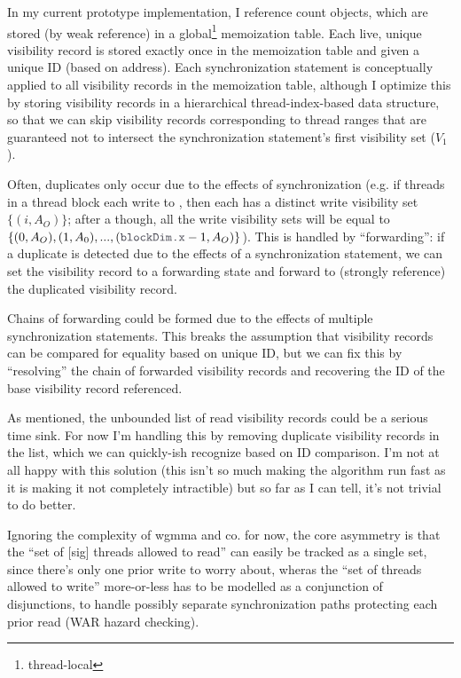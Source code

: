\filbreak
In my current prototype implementation, I reference count  objects, which are stored (by weak reference) in a global\footnote{thread-local} memoization table.
Each live, unique visibility record is stored exactly once in the memoization table and given a unique ID (based on address).
Each synchronization statement is conceptually applied to all visibility records in the memoization table, although I optimize this by storing visibility records in a hierarchical thread-index-based data structure, so that we can skip visibility records corresponding to thread ranges that are guaranteed not to intersect the synchronization statement's first visibility set ($V_1$).

\filbreak
Often, duplicates only occur due to the effects of synchronization (e.g. if threads in a thread block each write to , then each  has a distinct write visibility set ${\{(i, A_O)\}}$; after a  though, all the write visibility sets will be equal to ${\{(0, A_O), (1, A_0), ... ,(\lighttt{blockDim.x}-1, A_O)\}}$).
This is handled by ``forwarding'': if a duplicate is detected due to the effects of a synchronization statement, we can set the visibility record to a forwarding state and forward to (strongly reference) the duplicated visibility record.

\filbreak
Chains of forwarding could be formed due to the effects of multiple synchronization statements.
This breaks the assumption that visibility records can be compared for equality based on unique ID, but we can fix this by ``resolving'' the chain of forwarded visibility records and recovering the ID of the base visibility record referenced.

\filbreak
{} As mentioned, the unbounded list of read visibility records could be a serious time sink.
For now I'm handling this by removing duplicate visibility records in the list, which we can quickly-ish recognize based on ID comparison.
I'm not at all happy with this solution (this isn't so much making the algorithm run fast as it is making it not completely intractible) but so far as I can tell, it's not trivial to do better.

\filbreak
Ignoring the complexity of wgmma and co. for now, the core asymmetry is that the ``set of [sig] threads allowed to read'' can easily be tracked as a single set, since there's only one prior write to worry about, wheras the ``set of threads allowed to write'' more-or-less has to be modelled as a conjunction of disjunctions, to handle possibly separate synchronization paths protecting each prior read (WAR hazard checking).

